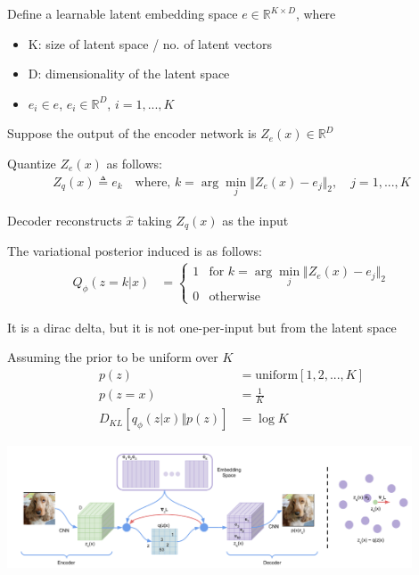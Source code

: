 \documentclass[11pt]{article}
\begin{document}
\vspace{1em}

Define a learnable latent embedding space $e \in \mathbb{R}^{K \times D}$, where

\begin{itemize}
\item K: size of latent space / no. of latent vectors
\item D: dimensionality of the latent space
\item $e_i \in e$, $e_i \in \mathbb{R}^D$, $i = 1, ..., K$
\end{itemize}

Suppose the output of the encoder network is $Z_e(x) \in \mathbb{R}^D$

Quantize $Z_e(x)$ as follows:
\begin{align*}
  Z_q(x) \triangleq e_k\quad\text{where, } k = \arg\min_j \Vert Z_e(x) - e_j \Vert_2,\quad j = 1, ..., K
\end{align*}

\vspace{1em}
Decoder reconstructs $\hat{x}$ taking $Z_q(x)$ as the input

The variational posterior induced is as follows:
\begin{align*}
  Q_{\phi}(z = k | x) &= \begin{cases}
                           1 & \text{for } k = \arg\min_j \Vert Z_e(x) - e_j \Vert_2\\
                           0 & \text{otherwise}
                         \end{cases}
\end{align*}

It is a dirac delta, but it is not one-per-input but from the latent space

Assuming the prior to be uniform over $K$
\begin{align*}
  p(z) &= \text{uniform}[1,2,...,K] \\
  p(z = x) &= \frac{1}{K} \\
  D_{KL}\left[ q_{\phi}(z|x) \Vert p(z) \right] &= \log K
\end{align*}


\includegraphics[width=0.9\textwidth]{figures/vq-vae-paper}
\end{document}
